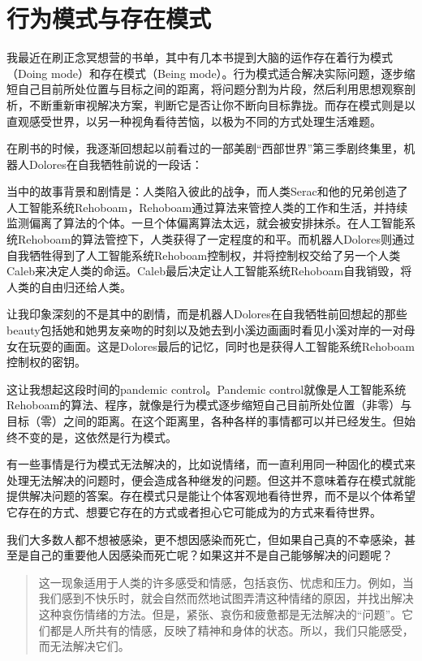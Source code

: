 \chapter{行为模式与存在模式}




我最近在刷正念冥想营的书单，其中有几本书提到大脑的运作存在着行为模式（Doing mode）和存在模式（Being mode）。行为模式适合解决实际问题，逐步缩短自己目前所处位置与目标之间的距离，将问题分割为片段，然后利用思想观察剖析，不断重新审视解决方案，判断它是否让你不断向目标靠拢。而存在模式则是以直观感受世界，以另一种视角看待苦恼，以极为不同的方式处理生活难题。

在刷书的时候，我逐渐回想起以前看过的一部美剧“西部世界”第三季剧终集里，机器人Dolores在自我牺牲前说的一段话：


当中的故事背景和剧情是：人类陷入彼此的战争，而人类Serac和他的兄弟创造了人工智能系统Rehoboam，Rehoboam通过算法来管控人类的工作和生活，并持续监测偏离了算法的个体。一旦个体偏离算法太远，就会被安排抹杀。在人工智能系统Rehoboam的算法管控下，人类获得了一定程度的和平。而机器人Dolores则通过自我牺牲得到了人工智能系统Rehoboam控制权，并将控制权交给了另一个人类Caleb来决定人类的命运。Caleb最后决定让人工智能系统Rehoboam自我销毁，将人类的自由归还给人类。

让我印象深刻的不是其中的剧情，而是机器人Dolores在自我牺牲前回想起的那些beauty\pozhehao{}包括她和她男友亲吻的时刻以及她去到小溪边画画时看见小溪对岸的一对母女在玩耍的画面。这是Dolores最后的记忆，同时也是获得人工智能系统Rehoboam控制权的密钥。

这让我想起这段时间的pandemic control。Pandemic control就像是人工智能系统Rehoboam的算法、程序，就像是行为模式\pozhehao{}逐步缩短自己目前所处位置（非零）与目标（零）之间的距离。在这个距离里，各种各样的事情都可以并已经发生。但始终不变的是，这依然是行为模式。

有一些事情是行为模式无法解决的，比如说情绪，而一直利用同一种固化的模式来处理无法解决的问题时，便会造成各种继发的问题。但这并不意味着存在模式就能提供解决问题的答案。存在模式只是能让个体客观地看待世界，而不是以个体希望它存在的方式、想要它存在的方式或者担心它可能成为的方式来看待世界。

我们大多数人都不想被感染，更不想因感染而死亡，但如果自己真的不幸感染，甚至是自己的重要他人因感染而死亡呢？如果这并不是自己能够解决的问题呢？

\blockquote{
	这一现象适用于人类的许多感受和情感，包括哀伤、忧虑和压力。例如，当我们感到不快乐时，就会自然而然地试图弄清这种情绪的原因，并找出解决这种哀伤情绪的方法。但是，紧张、哀伤和疲惫都是无法解决的“问题”。它们都是人所共有的情感，反映了精神和身体的状态。所以，我们只能感受，而无法解决它们。
}

